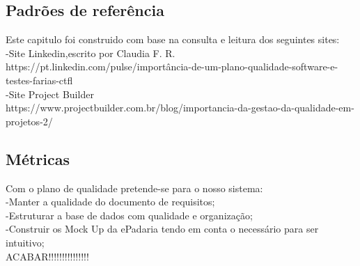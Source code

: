 \subsection{Padrões de referência}
Este capitulo foi construido com base na consulta e leitura dos seguintes sites:\\
-Site Linkedin,escrito por Claudia F. R. \\
https://pt.linkedin.com/pulse/importância-de-um-plano-qualidade-software-e-testes-farias-ctfl \\
-Site Project Builder\\
https://www.projectbuilder.com.br/blog/importancia-da-gestao-da-qualidade-em-projetos-2/
\subsection{Métricas}
Com o plano de qualidade pretende-se para o nosso sistema:\\
-Manter a qualidade do documento de requisitos;\\
-Estruturar a base de dados com qualidade e organização;\\
-Construir os Mock Up da ePadaria tendo em conta o necessário para ser intuitivo;\\
ACABAR!!!!!!!!!!!!!!!